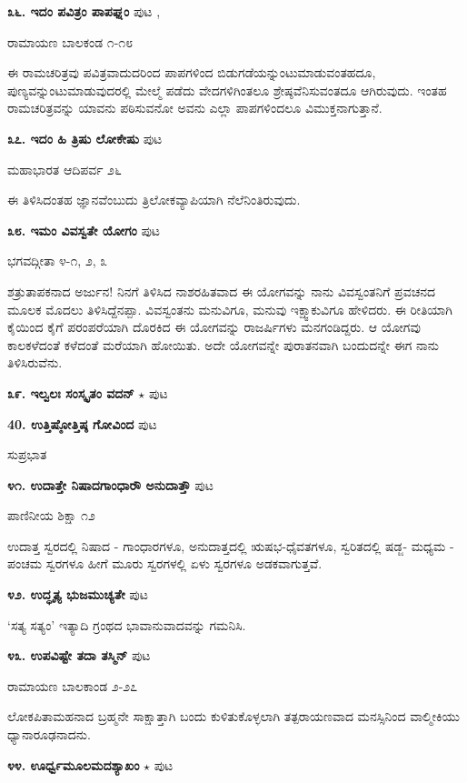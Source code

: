 \medskip
\noindent\textbf{೩೬. ಇದಂ ಪವಿತ್ರಂ ಪಾಪಘ್ನಂ} \hfill ಪುಟ \pageref{181},\pageref{211}

\hfill ರಾಮಾಯಣ ಬಾಲಕಂಡ ೧-೧೮

ಈ ರಾಮಚರಿತ್ರವು ಪವಿತ್ರವಾದುದರಿಂದ ಪಾಪಗಳಿಂದ ಬಿಡುಗಡೆಯನ್ನುಂಟುಮಾಡುವಂತಹದೂ, ಪುಣ್ಯವನ್ನುಂಟುಮಾಡುವುದರಲ್ಲಿ ಮೇಲ್ಮೆ  ಪಡೆದು ವೇದಗಳಿಗಿಂತಲೂ ಶ್ರೇಷ್ಠವೆನಿಸುವಂತದೂ ಆಗಿರುವುದು. ಇಂತಹ ರಾಮಚರಿತ್ರವನ್ನು ಯಾವನು ಪಠಿಸುವನೋ ಅವನು ಎಲ್ಲಾ ಪಾಪಗಳಿಂದಲೂ ವಿಮುಕ್ತನಾಗುತ್ತಾನೆ. 

\medskip
\noindent\textbf{೩೭. ಇದಂ ಹಿ ತ್ರಿಷು ಲೋಕೇಷು} \hfill ಪುಟ \pageref{118}

\hfill ಮಹಾಭಾರತ ಆದಿಪರ್ವ ೨೬

ಈ ತಿಳಿಸಿದಂತಹ ಜ್ಞಾನವೆಂಬುದು ತ್ರಿಲೋಕವ್ಯಾಪಿಯಾಗಿ ನೆಲೆನಿಂತಿರುವುದು. 

\medskip
\noindent\textbf{೩೮. ಇಮಂ ವಿವಸ್ವತೇ ಯೋಗಂ} \hfill ಪುಟ \pageref{90}

\hfill ಭಗವದ್ಗೀತಾ ೪-೧, ೨, ೩

ಶತ್ರುತಾಪಕನಾದ ಅರ್ಜುನ! ನಿನಗೆ ತಿಳಿಸಿದ ನಾಶರಹಿತವಾದ ಈ ಯೋಗವನ್ನು ನಾನು ವಿವಸ್ವಂತನಿಗೆ ಪ್ರವಚನದ ಮೂಲಕ ಮೊದಲು ತಿಳಿಸಿದ್ದೆನಪ್ಪಾ. ವಿವಸ್ವಂತನು ಮನುವಿಗೂ, ಮನುವು ಇಕ್ಷ್ವಾಕುವಿಗೂ ಹೇಳಿದರು. ಈ ರೀತಿಯಾಗಿ ಕೈಯಿಂದ ಕೈಗೆ ಪರಂಪರೆಯಾಗಿ ದೊರಕಿದ ಈ ಯೋಗವನ್ನು ರಾಜರ್ಷಿಗಳು ಮನಗಂಡಿದ್ದರು. ಆ ಯೋಗವು ಕಾಲಕಳೆದಂತೆ ಕಳೆದಂತೆ ಮರೆಯಾಗಿ ಹೋಯಿತು. ಅದೇ ಯೋಗವನ್ನೇ ಪುರಾತನವಾಗಿ ಬಂದುದನ್ನೇ ಈಗ ನಾನು ತಿಳಿಸಿರುವೆನು.

\medskip
\noindent\textbf{೩೯. ಇಲ್ವಲಃ ಸಂಸ್ಕೃತಂ ವದನ್} $\star$ \hfill ಪುಟ \pageref{232}

\medskip
\noindent\textbf{40. ಉತ್ತಿಷ್ಠೋತ್ತಿಷ್ಠ ಗೋವಿಂದ} \hfill ಪುಟ \pageref{147}

\hfill ಸುಪ್ರಭಾತ

\medskip
\noindent\textbf{೪೧. ಉದಾತ್ತೇ ನಿಷಾದಗಾಂಧಾರೌ ಅನುದಾತ್ತೌ} \hfill ಪುಟ \pageref{13}

\hfill ಪಾಣಿನೀಯ ಶಿಕ್ಷಾ ೧೨

ಉದಾತ್ತ ಸ್ವರದಲ್ಲಿ ನಿಷಾದ - ಗಾಂಧಾರಗಳೂ, ಅನುದಾತ್ತದಲ್ಲಿ ಋಷಭ-ಧೈವತಗಳೂ, ಸ್ವರಿತದಲ್ಲಿ ಷಡ್ಜ- ಮಧ್ಯಮ - ಪಂಚಮ ಸ್ವರಗಳೂ ಹೀಗೆ ಮೂರು ಸ್ವರಗಳಲ್ಲಿ ಏಳು ಸ್ವರಗಳೂ ಅಡಕವಾಗುತ್ತವೆ.

\medskip
\noindent\textbf{೪೨. ಉದ್ಧೃತ್ಯ ಭುಜಮುಚ್ಯತೇ} \hfill ಪುಟ \pageref{130}

`ಸತ್ಯ ಸತ್ಯಂ' ಇತ್ಯಾದಿ ಗ್ರಂಥದ ಭಾವಾನುವಾದವನ್ನು ಗಮನಿಸಿ.

\medskip
\noindent\textbf{೪೩. ಉಪವಿಷ್ಟೇ ತದಾ ತಸ್ಮಿನ್} \hfill ಪುಟ \pageref{203}

\hfill ರಾಮಾಯಣ ಬಾಲಕಾಂಡ ೨-೨೭

ಲೋಕಪಿತಾಮಹನಾದ ಬ್ರಹ್ಮನೇ ಸಾಕ್ಷಾತ್ತಾಗಿ ಬಂದು ಕುಳಿತುಕೊಳ್ಳಲಾಗಿ ತತ್ಪರಾಯಣವಾದ ಮನಸ್ಸಿನಿಂದ ವಾಲ್ಮೀಕಿಯು ಧ್ಯಾನಾರೂಢನಾದನು.

\medskip
\noindent\textbf{೪೪. ಊರ್ಧ್ವಮೂಲಮದಶ್ಯಾಖಂ} $\star$ \hfill ಪುಟ \pageref{13}

